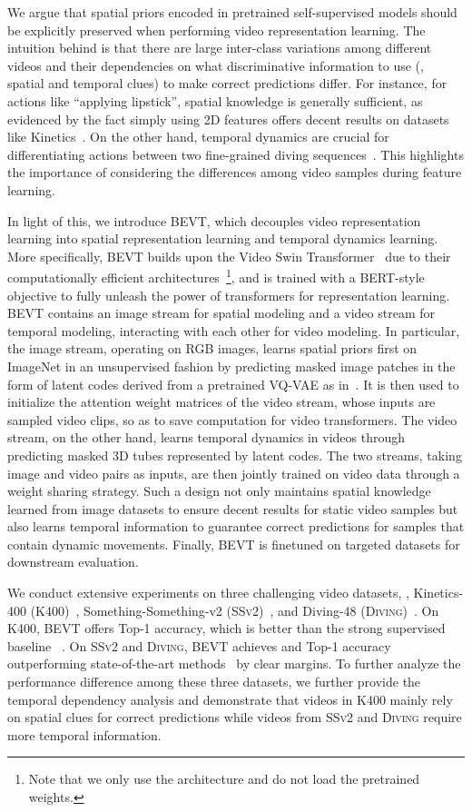 \documentclass[10pt,twocolumn,letterpaper]{article}
\makeatletter
\newcommand*{\system}{BEVT\@\xspace}
\newcommand{\ssv}{{\scshape SSv2}\xspace}
\newcommand{\diving}{{\scshape Diving\-48}\xspace}
\newcommand{\kn}{{\scshape K400}\xspace}
\makeatother
\begin{document}
We argue that spatial priors encoded in pretrained self-supervised models should be explicitly preserved when performing video representation learning. The intuition behind is that there are large inter-class variations among different videos and their dependencies on what discriminative information to use (\ie, spatial and temporal clues) to make correct predictions differ. For instance, for actions like ``applying lipstick'', spatial knowledge is generally sufficient, as evidenced by the fact simply using 2D features offers decent results on datasets like Kinetics~\cite{quovadis}. On the other hand, temporal dynamics are crucial for differentiating actions between two fine-grained diving sequences~\cite{resound}. This highlights the importance of considering the differences among video samples during feature learning. 

In light of this, we introduce \system, which decouples video representation learning into spatial representation learning and temporal dynamics learning.  More specifically, \system builds upon the Video Swin Transformer~\cite{liu2021video} due to their computationally efficient architectures~\footnote{Note that we only use the architecture and do not load the pretrained weights.}, and is trained with a BERT-style objective to fully unleash the power of transformers for representation learning. \system contains an image stream for spatial modeling and a video stream for temporal modeling, interacting with each other for video modeling. In particular, the image stream, operating on RGB images, learns spatial priors first on ImageNet in an unsupervised fashion by predicting masked image patches in the form of latent codes derived from a pretrained VQ-VAE as in~\cite{bao2021beit}. It is then used to initialize the attention weight matrices of the video stream, whose inputs are sampled video clips, so as to save computation for video transformers. The video stream, on the other hand, learns temporal dynamics in videos through predicting masked 3D tubes represented by latent codes. The two streams, taking image and video pairs as inputs, are then jointly trained on video data through a weight sharing strategy. Such a design not only maintains spatial knowledge learned from image datasets to ensure decent results for static video samples but also learns temporal information to guarantee correct predictions for samples that contain dynamic movements. Finally, \system is finetuned on targeted datasets for downstream evaluation.

We conduct extensive experiments on three challenging video datasets, \ie, Kinetics-400 (\kn)~\cite{quovadis}, Something-Something-v2 (\ssv)~\cite{ssv2}, and Diving-48 (\diving)~\cite{resound}. On \kn, \system offers  Top-1 accuracy, which is better than the strong supervised baseline ~\cite{liu2021video}. On \ssv and \diving, \system achieves  and  Top-1 accuracy outperforming state-of-the-art methods~\cite{gberta_2021_ICML,liu2021video,arnab2021vivit,slowfast}
by clear margins. To further analyze the performance difference among these three datasets, we further provide the temporal dependency analysis and demonstrate that videos in \kn mainly rely on spatial clues for correct predictions while videos from \ssv and \diving require more temporal information. 
\end{document}
